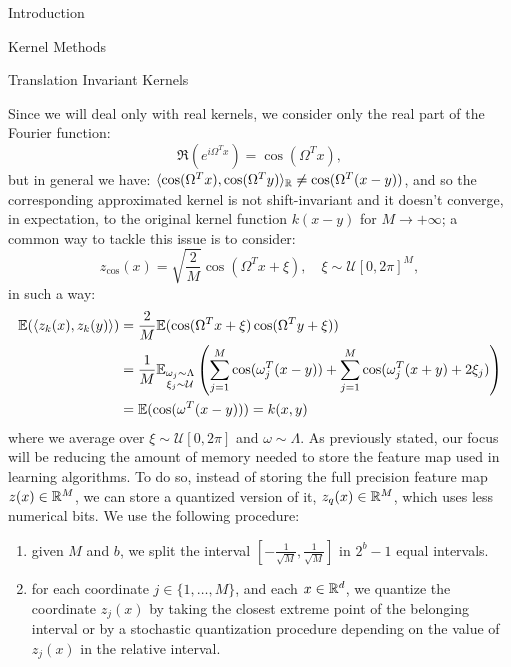\begin{chapter}{Introduction}
\begin{section}{Kernel Methods}
\begin{subsection}{Translation Invariant Kernels}
\begin{definition}
      \end{definition}
      Since we will deal only with real kernels, we consider only the real part of the Fourier function:
      $$\Re(e^{i \Omega^T x}) = \cos(\Omega^T x),$$
      but in general we have: $\langle \cos(\Omega^T x), \cos(\Omega^T y) \rangle_{\mathbb{R}} \neq \cos(\Omega^T (x-y))$, and so the corresponding approximated kernel is not
      shift-invariant and it doesn't converge, in expectation, to the original kernel function $k(x-y)$ for $M \to +\infty$; a common way to tackle this issue is to consider:
      $$
          z_{\cos}(x) = \sqrt{\frac{2}{M}}\cos(\Omega^T x + \xi), \quad \xi \sim \mathcal{U}[0, 2\pi]^M,
      $$
      in such a way:
      \begin{align*}
          \mathbb{E}(\langle z_k(x), z_k(y) \rangle) & = \frac{2}{M}\mathbb{E} (\cos(\Omega^T x + \xi)\cos(\Omega^T y + \xi ))
          \\
                                         & = \frac{1}{M}\mathbb{E}_{\substack{\omega_j \sim \Lambda \\ \xi_j \sim \mathcal{U}}}\left(\sum_{j=1}^M \cos(\omega_j^T(x-y))+\sum_{j=1}^M \cos(\omega_j^T(x+y)+2\xi_j)\right) \\
                                         & = \mathbb{E}(\cos(\omega^T(x-y))) = k(x,y)
      \end{align*}
      where we average over $\xi \sim \mathcal{U}[0, 2\pi]$ and $\omega \sim \Lambda$.
      \vspace{5pt}
      \newline As previously stated, our focus will be reducing the amount of memory needed to store the feature map used in learning algorithms.
      To do so, instead of storing the full precision feature map $z(x) \in \mathbb{R}^M$, we can store a quantized version of it, $z_q(x) \in \mathbb{R}^M$, which uses
      less numerical bits. We use the following procedure:
      \begin{enumerate}
          \item given $M$ and $b$, we split the interval $[-\frac{1}{\sqrt{M}}, \frac{1}{\sqrt{M}}]$ in $2^b-1$ equal intervals.
          \item for each coordinate $j \in \{1, \dots, M\}$, and each $x \in \mathbb{R}^d$, we quantize the coordinate $z_j(x)$ by taking the closest extreme point of the
                belonging interval or by a stochastic quantization procedure depending on the value of $z_j(x)$ in the relative interval.
      \end{enumerate}




  \end{subsection}
 \end{section}



\end{chapter}